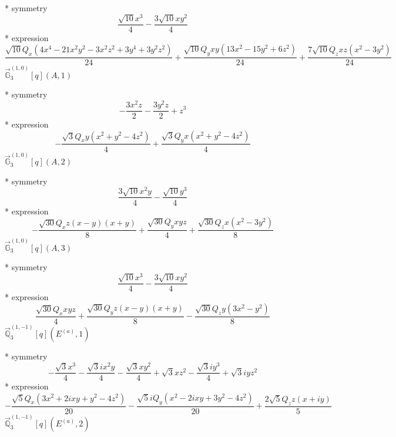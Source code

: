 \documentclass[fleqn,8pt]{jsarticle}
\begin{document}
\noindent\quad ** symmetry
\begin{dmath*}
\frac{\sqrt{10} x^{3}}{4} - \frac{3 \sqrt{10} x y^{2}}{4}
\end{dmath*}
\noindent\quad ** expression
\begin{dmath*}
\frac{\sqrt{10} Q_{x} \left(4 x^{4} - 21 x^{2} y^{2} - 3 x^{2} z^{2} + 3 y^{4} + 3 y^{2} z^{2}\right)}{24} + \frac{\sqrt{10} Q_{y} x y \left(13 x^{2} - 15 y^{2} + 6 z^{2}\right)}{24} + \frac{7 \sqrt{10} Q_{z} x z \left(x^{2} - 3 y^{2}\right)}{24}
\end{dmath*}
\noindent\quad $\vec{\mathbb{G}}_{3}^{(1,0)}[q](A,1)$

\noindent\quad ** symmetry
\begin{dmath*}
- \frac{3 x^{2} z}{2} - \frac{3 y^{2} z}{2} + z^{3}
\end{dmath*}
\noindent\quad ** expression
\begin{dmath*}
- \frac{\sqrt{3} Q_{x} y \left(x^{2} + y^{2} - 4 z^{2}\right)}{4} + \frac{\sqrt{3} Q_{y} x \left(x^{2} + y^{2} - 4 z^{2}\right)}{4}
\end{dmath*}
\noindent\quad $\vec{\mathbb{G}}_{3}^{(1,0)}[q](A,2)$

\noindent\quad ** symmetry
\begin{dmath*}
\frac{3 \sqrt{10} x^{2} y}{4} - \frac{\sqrt{10} y^{3}}{4}
\end{dmath*}
\noindent\quad ** expression
\begin{dmath*}
- \frac{\sqrt{30} Q_{x} z \left(x - y\right) \left(x + y\right)}{8} + \frac{\sqrt{30} Q_{y} x y z}{4} + \frac{\sqrt{30} Q_{z} x \left(x^{2} - 3 y^{2}\right)}{8}
\end{dmath*}
\noindent\quad $\vec{\mathbb{G}}_{3}^{(1,0)}[q](A,3)$

\noindent\quad ** symmetry
\begin{dmath*}
\frac{\sqrt{10} x^{3}}{4} - \frac{3 \sqrt{10} x y^{2}}{4}
\end{dmath*}
\noindent\quad ** expression
\begin{dmath*}
\frac{\sqrt{30} Q_{x} x y z}{4} + \frac{\sqrt{30} Q_{y} z \left(x - y\right) \left(x + y\right)}{8} - \frac{\sqrt{30} Q_{z} y \left(3 x^{2} - y^{2}\right)}{8}
\end{dmath*}
\noindent\quad $\vec{\mathbb{Q}}_{3}^{(1,-1)}[q](E^{(a)},1)$

\noindent\quad ** symmetry
\begin{dmath*}
- \frac{\sqrt{3} x^{3}}{4} - \frac{\sqrt{3} i x^{2} y}{4} - \frac{\sqrt{3} x y^{2}}{4} + \sqrt{3} x z^{2} - \frac{\sqrt{3} i y^{3}}{4} + \sqrt{3} i y z^{2}
\end{dmath*}
\noindent\quad ** expression
\begin{dmath*}
- \frac{\sqrt{5} Q_{x} \left(3 x^{2} + 2 i x y + y^{2} - 4 z^{2}\right)}{20} - \frac{\sqrt{5} i Q_{y} \left(x^{2} - 2 i x y + 3 y^{2} - 4 z^{2}\right)}{20} + \frac{2 \sqrt{5} Q_{z} z \left(x + i y\right)}{5}
\end{dmath*}
\noindent\quad $\vec{\mathbb{Q}}_{3}^{(1,-1)}[q](E^{(a)},2)$
\end{document}
